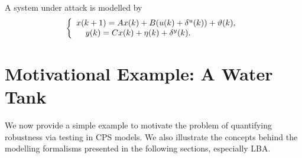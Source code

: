 {%
A system under attack is modelled by
\begin{equation}
\left\{
\begin{array}{ll}
{x}({k+1}) = A x(k) + B (u(k) + \delta^u(k)) + \vartheta(k),\label{17} \\
\text{ \ \ }\hspace{.35mm}{y}(k) = C x(k) + \eta(k) + \delta^y(k).
\end{array}
\right.
\end{equation}
}
\section{Motivational Example: A Water Tank}
\label{sec:example}
We now provide a simple example to motivate the problem of quantifying robustness via testing in CPS models. We also illustrate the concepts behind the modelling formalisms presented in the following sections, especially LBA.


